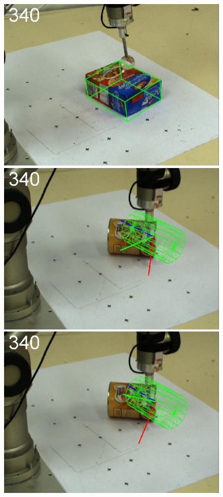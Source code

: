 \begin{figure}[htbp]
{\includegraphics[width=\imgAXwid]{./A2_LWPR1_399_5}
\includegraphics[width=\imgAXwid]{./A3_2exp_39_5}
\includegraphics[width=\imgAXwid]{./A3_LWPR1_39_5}
}
\end{figure}
